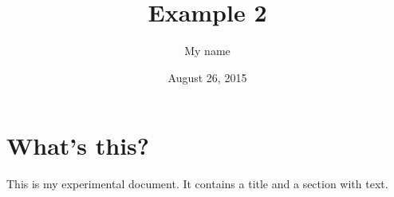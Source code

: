 \documentclass[a4paper,11pt]{article}
\begin{document}
\title{Example 2}
\author{My name}
\date{August 26, 2015}
\maketitle
\section{What's this?}
This is my experimental document. It contains a title and a section with text.
\end{document}
